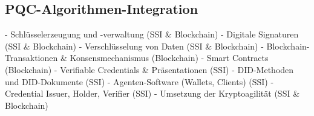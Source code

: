 \subsection{PQC-Algorithmen-Integration} \label{sec:PQC-Algorithmen-Integration}

- Schlüsselerzeugung und -verwaltung (SSI \& Blockchain)
- Digitale Signaturen (SSI \& Blockchain)
- Verschlüsselung von Daten (SSI \& Blockchain)
- Blockchain-Transaktionen \& Konsensmechanismus (Blockchain)
- Smart Contracts (Blockchain)
- Verifiable Credentials \& Präsentationen (SSI)
- DID-Methoden und DID-Dokumente (SSI)
- Agenten-Software (Wallets, Clients) (SSI)
- Credential Issuer, Holder, Verifier (SSI)
- Umsetzung der Kryptoagilität (SSI \& Blockchain)